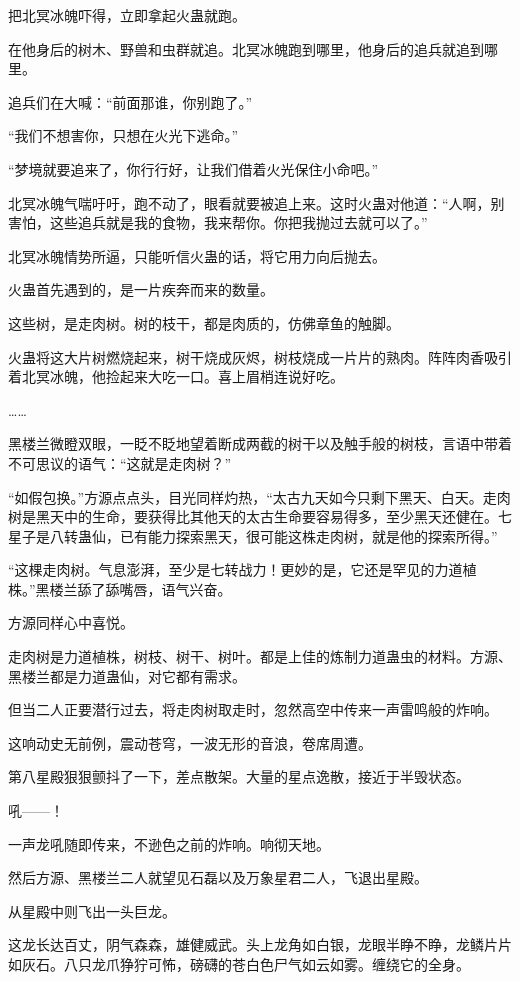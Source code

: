 \begin{this_body}
把北冥冰魄吓得，立即拿起火蛊就跑。

在他身后的树木、野兽和虫群就追。北冥冰魄跑到哪里，他身后的追兵就追到哪里。

追兵们在大喊：“前面那谁，你别跑了。”

“我们不想害你，只想在火光下逃命。”

“梦境就要追来了，你行行好，让我们借着火光保住小命吧。”

北冥冰魄气喘吁吁，跑不动了，眼看就要被追上来。这时火蛊对他道：“人啊，别害怕，这些追兵就是我的食物，我来帮你。你把我抛过去就可以了。”

北冥冰魄情势所逼，只能听信火蛊的话，将它用力向后抛去。

火蛊首先遇到的，是一片疾奔而来的数量。

这些树，是走肉树。树的枝干，都是肉质的，仿佛章鱼的触脚。

火蛊将这大片树燃烧起来，树干烧成灰烬，树枝烧成一片片的熟肉。阵阵肉香吸引着北冥冰魄，他捡起来大吃一口。喜上眉梢连说好吃。

……

黑楼兰微瞪双眼，一眨不眨地望着断成两截的树干以及触手般的树枝，言语中带着不可思议的语气：“这就是走肉树？”

“如假包换。”方源点点头，目光同样灼热，“太古九天如今只剩下黑天、白天。走肉树是黑天中的生命，要获得比其他天的太古生命要容易得多，至少黑天还健在。七星子是八转蛊仙，已有能力探索黑天，很可能这株走肉树，就是他的探索所得。”

“这棵走肉树。气息澎湃，至少是七转战力！更妙的是，它还是罕见的力道植株。”黑楼兰舔了舔嘴唇，语气兴奋。

方源同样心中喜悦。

走肉树是力道植株，树枝、树干、树叶。都是上佳的炼制力道蛊虫的材料。方源、黑楼兰都是力道蛊仙，对它都有需求。

但当二人正要潜行过去，将走肉树取走时，忽然高空中传来一声雷鸣般的炸响。

这响动史无前例，震动苍穹，一波无形的音浪，卷席周遭。

第八星殿狠狠颤抖了一下，差点散架。大量的星点逸散，接近于半毁状态。

吼——！

一声龙吼随即传来，不逊色之前的炸响。响彻天地。

然后方源、黑楼兰二人就望见石磊以及万象星君二人，飞退出星殿。

从星殿中则飞出一头巨龙。

这龙长达百丈，阴气森森，雄健威武。头上龙角如白银，龙眼半睁不睁，龙鳞片片如灰石。八只龙爪狰狞可怖，磅礴的苍白色尸气如云如雾。缠绕它的全身。


\end{this_body}
